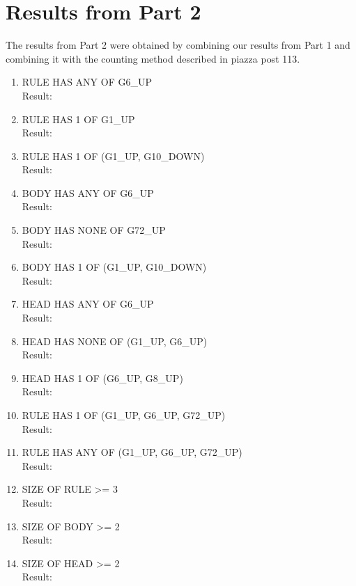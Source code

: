 \documentclass[12pt]{article}
\begin{document}
\section*{Results from Part 2}
\noindent The results from Part 2 were obtained by combining our results from Part 1 and combining it with the counting method described in piazza post 113.
\begin{enumerate} 
	\item RULE HAS ANY OF G6\_UP \\
	Result: \\
	\item RULE HAS 1 OF G1\_UP \\
	Result: \\
	\item RULE HAS 1 OF (G1\_UP, G10\_DOWN) \\
	Result: \\
	\item BODY HAS ANY OF G6\_UP \\
	Result: \\
	\item BODY HAS NONE OF G72\_UP\\
	Result: \\
	\item BODY HAS 1 OF (G1\_UP, G10\_DOWN)\\
	Result: \\
	\item HEAD HAS ANY OF G6\_UP\\
	Result: \\
	\item HEAD HAS NONE OF (G1\_UP, G6\_UP)\\
	Result: \\
	\item HEAD HAS 1 OF (G6\_UP, G8\_UP)\\
	Result: \\
	\item RULE HAS 1 OF (G1\_UP, G6\_UP, G72\_UP)\\
	Result: \\
	\item RULE HAS ANY OF (G1\_UP, G6\_UP, G72\_UP)\\
	Result: \\

	\item SIZE OF RULE >= 3 \\
	Result: \\
	\item SIZE OF BODY >= 2 \\
	Result: \\
	\item SIZE OF HEAD >= 2 \\
	Result: \\


\end{enumerate}
\end{document}
